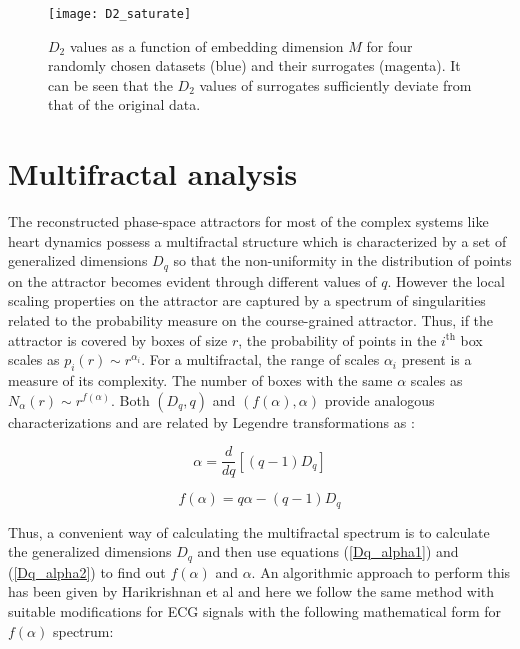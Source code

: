 \documentclass[9pt,twocolumn,twoside]{pnas-new}
\begin{document}
\begin{figure}[h]
\begin{center}
\texttt{[image: D2\_saturate]}
\caption{\label{D2_saturate}  $D_2$ values as a function of embedding dimension $M$ for four randomly chosen datasets (blue) and their surrogates (magenta). It can be seen that the $D_2$ values of surrogates sufficiently deviate from that of the original data.}
\end{center}
\end{figure}

\section{\label{multifractal_analysis}Multifractal analysis}
The reconstructed phase-space attractors for most of the complex systems like heart dynamics possess a multifractal structure which is characterized by a set of generalized dimensions $D_q$ so that the non-uniformity in the distribution of points on the attractor becomes evident through different values of $q$. However the local scaling properties on the attractor are captured by a spectrum of singularities related to the probability measure on the course-grained attractor. Thus, if the attractor is covered by boxes of size $r$, the probability of points in the $i^{\text{th}}$ box scales as $p_i(r) \sim r^{\alpha_i}$. For a multifractal, the range of scales $\alpha_i$ present is a measure of its complexity. The number of boxes with the same $\alpha$ scales as $N_{\alpha}(r) \sim r^{f(\alpha)}$. Both $(D_q, q)$ and $(f(\alpha), \alpha)$ provide analogous characterizations and are related by Legendre transformations as \cite{harikrishnan2009computing}:

\begin{equation}
\label{Dq_alpha1}
\alpha = \frac{d}{dq}[(q-1)D_q]
\end{equation}

\begin{equation}
\label{Dq_alpha2}
f(\alpha) = q\alpha - (q-1)D_q
\end{equation}

Thus, a convenient way of calculating the multifractal spectrum is to calculate the generalized dimensions $D_q$ and then use equations (\ref{Dq_alpha1}) and (\ref{Dq_alpha2}) to find out $f(\alpha)$ and $\alpha$. An algorithmic approach to perform this has been given by Harikrishnan et al \cite{harikrishnan2009computing} and here we follow the same method with suitable modifications for ECG signals with the following mathematical form for $f(\alpha)$ spectrum:
\end{document}

